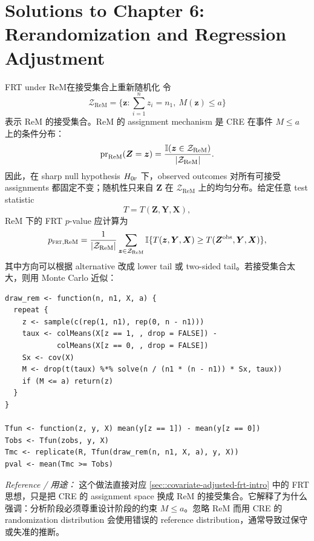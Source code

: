 \chapter{Solutions to Chapter 6: Rerandomization and Regression Adjustment}
\label{sol:chapter06}

\begin{exercisesolution}{FRT under ReM}{在接受集合上重新随机化}
令
\[
\mathcal{Z}_{\mathrm{ReM}}
=\{\boldsymbol{z}:\sum_{i=1}^n z_i=n_1,\ M(\boldsymbol{z})\leq a\}
\]
表示 ReM 的接受集合。ReM 的 assignment mechanism 是 CRE 在事件 $M\leq a$ 上的条件分布：
\[
\textup{pr}_{\mathrm{ReM}}(\boldsymbol{Z}=\boldsymbol{z})
=\frac{\mathbb{I}(\boldsymbol{z}\in\mathcal{Z}_{\mathrm{ReM}})}
{|\mathcal{Z}_{\mathrm{ReM}}|}.
\]
因此，在 sharp null hypothesis $H_{0\textsc{f}}$ 下，observed outcomes 对所有可接受 assignments 都固定不变；随机性只来自 $\boldsymbol{Z}$ 在 $\mathcal{Z}_{\mathrm{ReM}}$ 上的均匀分布。给定任意 test statistic
\[
T=T(\boldsymbol{Z},\boldsymbol{Y},\boldsymbol{X}),
\]
ReM 下的 FRT $p$-value 应计算为
\[
p_{\textsc{frt},\mathrm{ReM}}
=\frac{1}{|\mathcal{Z}_{\mathrm{ReM}}|}
\sum_{\boldsymbol{z}\in\mathcal{Z}_{\mathrm{ReM}}}
\mathbb{I}\{T(\boldsymbol{z},\boldsymbol{Y},\boldsymbol{X})
\geq T(\boldsymbol{Z}^{\mathrm{obs}},\boldsymbol{Y},\boldsymbol{X})\},
\]
其中方向可以根据 alternative 改成 lower tail 或 two-sided tail。若接受集合太大，则用 Monte Carlo 近似：
\begin{lstlisting}
draw_rem <- function(n, n1, X, a) {
  repeat {
    z <- sample(c(rep(1, n1), rep(0, n - n1)))
    taux <- colMeans(X[z == 1, , drop = FALSE]) -
            colMeans(X[z == 0, , drop = FALSE])
    Sx <- cov(X)
    M <- drop(t(taux) %*% solve(n / (n1 * (n - n1)) * Sx, taux))
    if (M <= a) return(z)
  }
}

Tfun <- function(z, y, X) mean(y[z == 1]) - mean(y[z == 0])
Tobs <- Tfun(zobs, y, X)
Tmc <- replicate(R, Tfun(draw_rem(n, n1, X, a), y, X))
pval <- mean(Tmc >= Tobs)
\end{lstlisting}

\emph{Reference / 用途：} 这个做法直接对应 \cref{sec::covariate-adjusted-frt-intro} 中的 FRT 思想，只是把 CRE 的 assignment space 换成 ReM 的接受集合。它解释了为什么 \citet{bruhn2009pursuit,morgan2012rerandomization} 强调：分析阶段必须尊重设计阶段的约束 $M\leq a$。忽略 ReM 而用 CRE 的 randomization distribution 会使用错误的 reference distribution，通常导致过保守或失准的推断。
\end{exercisesolution}

